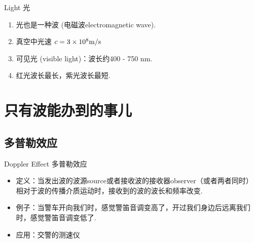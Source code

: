 \documentclass{beamer}
\begin{document}
\begin{frame}{Light 光}
	\begin{enumerate}
		\item 光也是一种波 (电磁波electromagnetic wave).
		\item 真空中光速 $c=3 \times 10^8 {\rm m/s}$
		\item 可见光 (visible light)：波长约400 - 750 nm.
		\item 红光波长最长，紫光波长最短.
	\end{enumerate}
	
	\begin{center}
	\end{center}
\end{frame}

\section{只有波能办到的事儿}

\subsection{多普勒效应}

\begin{frame}{Doppler Effect 多普勒效应}
	\begin{itemize}
		\item 定义：当发出波的波源source或者接收波的接收器observer（或者两者同时）相对于波的传播介质运动时，接收到的波的波长和频率改变.
		\item 例子：当警车开向我们时，感觉警笛音调变高了，开过我们身边后远离我们时，感觉警笛音调变低了.
		\item 应用：交警的测速仪
	\end{itemize}
\end{frame}
\end{document}
